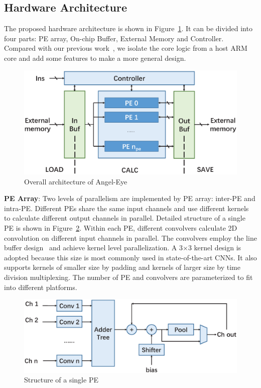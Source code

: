\documentclass[10pt, conference, compsocconf]{IEEEtran}
\begin{document}
\subsection{Hardware Architecture}
The proposed hardware architecture is shown in Figure~\ref{fig:arch}. It can be divided into four parts: PE array, On-chip Buffer, External Memory and Controller. Compared with our previous work~\cite{qiu2016going}, we isolate the core logic from a host ARM core and add some features to make a more general design.

\begin{figure}[t]
    \centering
    \includegraphics[width=1.0\columnwidth]{figure/hw_arch.eps}
    \small
    \caption{Overall architecture of Angel-Eye}
    \label{fig:arch}
\end{figure}

\textbf{PE Array}: Two levels of parallelism are implemented by PE array: inter-PE and intra-PE. Different PEs share the same input channels and use different kernels to calculate different output channels in parallel. Detailed structure of a single PE is shown in Figure~\ref{fig:pe}. Within each PE, different convolvers calculate 2D convolution on different input channels in parallel. The convolvers employ the line buffer design~\cite{bosi1999reconfigurable} and achieve kernel level parallelization. A 3$\times$3 kernel design is adopted because this size is most commonly used in state-of-the-art CNNs. It also supports kernels of smaller size by padding and kernels of larger size by time division multiplexing. The number of PE and convolvers are parameterized to fit into different platforms.

\begin{figure}[t]
  \centering
  \includegraphics[width=1.0\columnwidth]{figure/pe.eps}
  \small
  \caption{Structure of a single PE}
  \label{fig:pe}
\end{figure}
\end{document}
